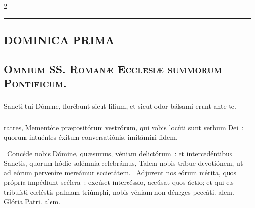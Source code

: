 \documentclass[9pt,twoside]{extarticle}
\begin{document}
\begin{multicols}{2}

\begin{center}\textcolor{red}{\rule{\linewidth}{0.5pt}} \end{center}

\subsection*{\center \textsc{DOMINICA PRIMA}}
\begin{center}\end{center}
\subsection*{\center \textsc{}}
\subsection*{\center \textsc{Omnium SS. Romanæ Ecclesiæ summorum Pontificum.}}
\subsubsection*{\center {}}

\begin{tightlist}{}
\item {} Sancti tui Dómine, florébunt sicut lílium, et sicut odor bálsami erunt ante te.
\item {}
\end{tightlist}

\subsubsection*{}
ratres, Mementóte præpositórum vestrórum, qui vobis locúti sunt verbum Dei~: quorum intuéntes éxitum conversatiónis, imitámini fidem.

\begin{tightlist}{}
\item {}~Concéde nobis Dómine, quæsumus, véniam delictórum~: et intercedéntibus Sanctis, quorum hódie solémnia celebrámus, \textred{*} Talem nobis tríbue devotiónem, ut ad eórum perveníre mereámur societátem. ~Adjuvent nos eórum mérita, quos própria impédiunt scélera~: excúset intercéssio, accúsat quos áctio; et qui eis tribuísti cœléstis palmam triúmphi, nobis véniam non déneges peccáti. alem. Glória Patri. alem.
\end{tightlist}


\end{multicols}
\end{document}

